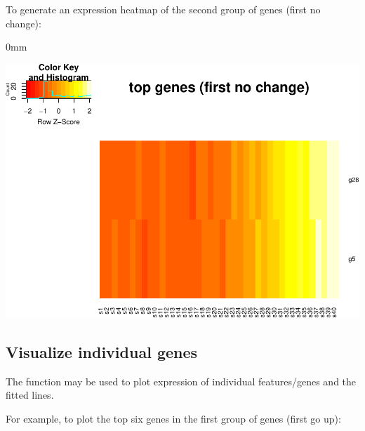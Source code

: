 \documentclass{article}
\begin{document}
To generate an expression heatmap of the second group of genes 
(first no change):
\begin{knitrout}
\color{fgcolor}\begin{kframe}
\begin{alltt}
\hlstd{(TrendyExampleData[}\hlopt{$}\hlstd{firstnochange),],}
  \hlstd{=}\hlstd{,} \hlstd{=}\hlstd{,}\hlstd{=}\hlstd{,}
        \hlstd{=}\hlstd{,} \hlstd{=}\hlstd{,}
        \hlstd{=}\hlstd{)}
\end{alltt}
\end{kframe}\begin{adjustwidth}{\fltoffset}{0mm}

{\centering \includegraphics[width=.8\textwidth]{figure/unnamed-chunk-9-1} 

}

\end{adjustwidth}
\end{knitrout}


\subsection{Visualize individual genes}
The  function may be used to plot expression of 
individual features/genes and the fitted lines.

For example, to plot the top six genes in the first group of genes (first go 
up):
\end{document}
